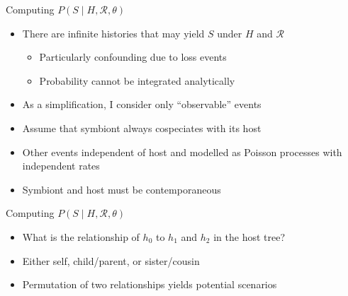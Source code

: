 \documentclass{beamer}
\newcommand{\R}{\ensuremath{\mathcal{R}}}
\begin{document}
\begin{frame}{Computing $P\left(S\mid H,\R,\theta\right)$}

\begin{itemize}

\item There are infinite histories that may yield $S$ under $H$ and $\R$
\begin{itemize}
\item Particularly confounding due to loss events
\item Probability cannot be integrated analytically
\end{itemize}
\pause

\item As a simplification, I consider only ``observable'' events \pause

\item Assume that symbiont always cospeciates with its host \pause

\item Other events independent of host and modelled as Poisson processes with independent rates \pause

\item Symbiont and host must be contemporaneous

\end{itemize}

\end{frame}

\begin{frame}{Computing $P\left(S\mid H,\R,\theta\right)$}

\centering

\pause
\begin{itemize}

\item What is the relationship of $h_0$ to $h_1$ and $h_2$ in the host tree?\pause

\item Either self, child/parent, or sister/cousin\pause

\item Permutation of two relationships yields potential scenarios

\end{itemize}

\end{frame}
\end{document}
